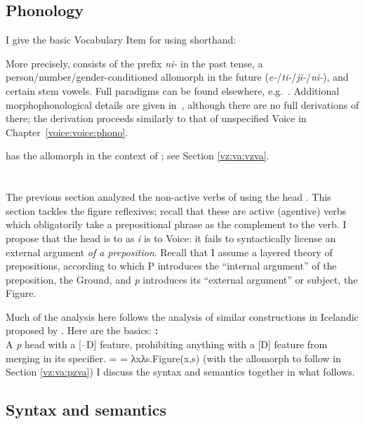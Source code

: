	
	\subsection{Phonology} \label{vz:vz:phono}
I give the basic Vocabulary Item for {\vz} using shorthand:
\ex {\vz} \lra~{\tnif}
\xe

More precisely, {\vz} consists of the prefix \emph{ni-} in the past tense, a person/number/gender-conditioned allomorph in the future (\emph{e-}/\emph{ti-}/\emph{ji-}/\emph{ni-}), and certain stem vowels. Full paradigms can be found elsewhere, e.g.~\cite{schwarzwald08}. Additional morphophonological details are given in~\cite{kastner18nllt}, although there are no full derivations of {\tnif} there; the derivation proceeds similarly to that of unspecified Voice in Chapter~\ref{voice:voice:phono}.

{\vz} has the allomorph {\thit} in the context of {\va}; see Section \ref{vz:va:vzva}.


\section{\pz} \label{vz:pz}
The previous section analyzed the non-active verbs of {\tnif} using the head {\vz}. This section tackles the figure reflexives; recall that these are active (agentive) verbs which obligatorily take a prepositional phrase as the complement to the verb. I propose that the head {\pz} is to {\vz} as \textit{i} is to Voice: it fails to syntactically license an external argument \emph{of a preposition}. Recall that I assume a layered theory of prepositions, according to which P introduces the ``internal argument'' of the preposition, the Ground, and \textit{p} introduces its ``external argument'' or subject, the Figure.

Much of the analysis here follows the analysis of similar constructions in Icelandic proposed by \cite{wood15springer}. Here are the basics:
\pex \textbf{\pz}
	\a \textbf{\pz:}\\
    A \textit{p} head with a [--D] feature, prohibiting anything with a [D] feature from merging in its specifier.
    \a \denote{\pz} =  = λxλs.Figure(x,s)
	\a {\pz} {\lra} {\tnif} \hfill (with the allomorph {\thit} to follow in Section \ref{vz:va:pzva})
\xe
I discuss the syntax and semantics together in what follows.

	\subsection{Syntax and semantics} \label{vz:pz:syn}	
